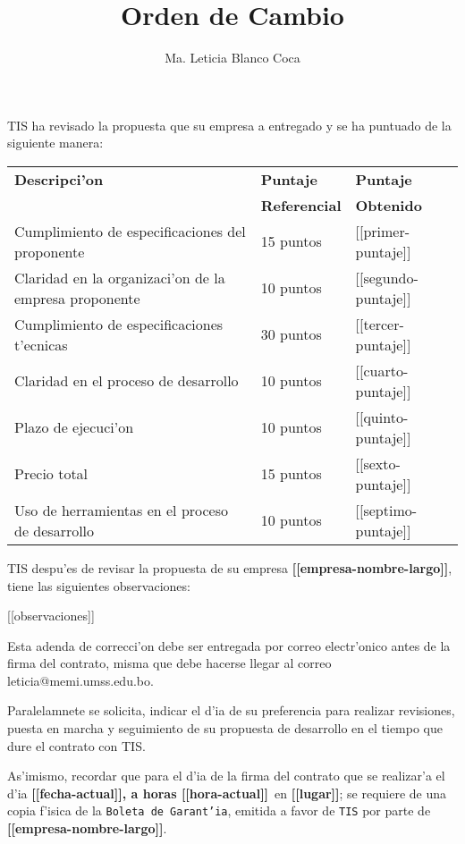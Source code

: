 \documentclass[10pt,letterpaper,twoside]{article}
\newcommand{\empresa}[0]{\textbf{[[empresa-nombre-largo]]}}
\newcommand{\diayhora}[0]{\textbf{[[fecha-actual]], a horas [[hora-actual]]}}
\newcommand{\lugar}[0]{\textbf{[[lugar]]}}
\newcommand{\pp}[0]{[[primer-puntaje]]}
\newcommand{\sep}[0]{[[segundo-puntaje]]}
\newcommand{\tp}[0]{[[tercer-puntaje]]}
\newcommand{\cp}[0]{[[cuarto-puntaje]]}
\newcommand{\qp}[0]{[[quinto-puntaje]]}
\newcommand{\ssp}[0]{[[sexto-puntaje]]}
\newcommand{\sssp}[0]{[[septimo-puntaje]]}
\begin{document}
\title{Orden de Cambio}
\author{Ma. Leticia Blanco Coca}
\maketitle


TIS ha revisado la propuesta que su empresa a entregado y se ha puntuado de la siguiente manera:

\begin{tabular}{|l|l|l|}
\hline \textbf{Descripci'on}& \textbf{Puntaje}&\textbf{Puntaje} \\
& \textbf{Referencial}&\textbf{Obtenido} \\
\hline Cumplimiento de especificaciones del proponente       & 15 puntos & \pp \\
\hline Claridad en la organizaci'on de la empresa proponente & 10 puntos & \sep \\
\hline Cumplimiento de especificaciones t'ecnicas            & 30 puntos & \tp \\ 
\hline Claridad en el proceso de desarrollo                  & 10 puntos & \cp \\
\hline Plazo de ejecuci'on                                   & 10 puntos & \qp \\
\hline Precio total                                          & 15 puntos & \ssp \\
\hline Uso de herramientas en el proceso de desarrollo       & 10 puntos & \sssp \\
\hline
\end{tabular}

TIS despu'es de revisar la propuesta de su empresa \empresa, tiene las siguientes observaciones:


[[observaciones]]

Esta adenda de correcci'on debe ser entregada por correo electr'onico antes de la firma del contrato, misma que debe hacerse llegar al correo leticia@memi.umss.edu.bo.


Paralelamnete se solicita, indicar el d'ia de su preferencia para realizar revisiones, puesta
en marcha  y 
seguimiento de su propuesta de desarrollo en el tiempo que dure el contrato con TIS.


As'imismo, recordar que para el d'ia de la firma del contrato que se realizar'a el d'ia \diayhora\ en \lugar; se requiere de una copia f'isica
 de la 
\texttt{Boleta de Garant'ia}, emitida a favor de \texttt{TIS} por parte de \empresa.
\end{document}
